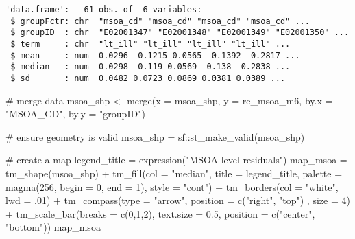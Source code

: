 \documentclass[
  letterpaper,
  krantz2]{style/krantz}
\newenvironment{Shaded}{\begin{snugshade}}{\end{snugshade}}
\newcommand{\AttributeTok}[1]{\textcolor[rgb]{0.40,0.45,0.13}{#1}}
\newcommand{\CommentTok}[1]{\textcolor[rgb]{0.37,0.37,0.37}{#1}}
\newcommand{\DecValTok}[1]{\textcolor[rgb]{0.68,0.00,0.00}{#1}}
\newcommand{\FloatTok}[1]{\textcolor[rgb]{0.68,0.00,0.00}{#1}}
\newcommand{\FunctionTok}[1]{\textcolor[rgb]{0.28,0.35,0.67}{#1}}
\newcommand{\NormalTok}[1]{\textcolor[rgb]{0.00,0.23,0.31}{#1}}
\newcommand{\OtherTok}[1]{\textcolor[rgb]{0.00,0.23,0.31}{#1}}
\newcommand{\SpecialCharTok}[1]{\textcolor[rgb]{0.37,0.37,0.37}{#1}}
\newcommand{\StringTok}[1]{\textcolor[rgb]{0.13,0.47,0.30}{#1}}
\begin{document}
\begin{verbatim}
'data.frame':   61 obs. of  6 variables:
 $ groupFctr: chr  "msoa_cd" "msoa_cd" "msoa_cd" "msoa_cd" ...
 $ groupID  : chr  "E02001347" "E02001348" "E02001349" "E02001350" ...
 $ term     : chr  "lt_ill" "lt_ill" "lt_ill" "lt_ill" ...
 $ mean     : num  0.0296 -0.1215 0.0565 -0.1392 -0.2817 ...
 $ median   : num  0.0298 -0.119 0.0569 -0.138 -0.2838 ...
 $ sd       : num  0.0482 0.0723 0.0869 0.0381 0.0389 ...
\end{verbatim}

\begin{Shaded}
\begin{Highlighting}[]
\CommentTok{\# merge data}
\NormalTok{msoa\_shp }\OtherTok{\textless{}{-}} \FunctionTok{merge}\NormalTok{(}\AttributeTok{x =}\NormalTok{ msoa\_shp, }\AttributeTok{y =}\NormalTok{ re\_msoa\_m6, }\AttributeTok{by.x =} \StringTok{"MSOA\_CD"}\NormalTok{, }\AttributeTok{by.y =} \StringTok{"groupID"}\NormalTok{)}
\end{Highlighting}
\end{Shaded}

\begin{Shaded}
\begin{Highlighting}[]
\CommentTok{\# ensure geometry is valid}
\NormalTok{msoa\_shp }\OtherTok{=}\NormalTok{ sf}\SpecialCharTok{::}\FunctionTok{st\_make\_valid}\NormalTok{(msoa\_shp)}

\CommentTok{\# create a map}
\NormalTok{legend\_title }\OtherTok{=} \FunctionTok{expression}\NormalTok{(}\StringTok{"MSOA{-}level residuals"}\NormalTok{)}
\NormalTok{map\_msoa }\OtherTok{=} \FunctionTok{tm\_shape}\NormalTok{(msoa\_shp) }\SpecialCharTok{+}
  \FunctionTok{tm\_fill}\NormalTok{(}\AttributeTok{col =} \StringTok{"median"}\NormalTok{, }\AttributeTok{title =}\NormalTok{ legend\_title, }\AttributeTok{palette =} \FunctionTok{magma}\NormalTok{(}\DecValTok{256}\NormalTok{, }\AttributeTok{begin =} \DecValTok{0}\NormalTok{, }\AttributeTok{end =} \DecValTok{1}\NormalTok{), }\AttributeTok{style =} \StringTok{"cont"}\NormalTok{) }\SpecialCharTok{+} 
  \FunctionTok{tm\_borders}\NormalTok{(}\AttributeTok{col =} \StringTok{"white"}\NormalTok{, }\AttributeTok{lwd =}\NormalTok{ .}\DecValTok{01}\NormalTok{)  }\SpecialCharTok{+} 
  \FunctionTok{tm\_compass}\NormalTok{(}\AttributeTok{type =} \StringTok{"arrow"}\NormalTok{, }\AttributeTok{position =} \FunctionTok{c}\NormalTok{(}\StringTok{"right"}\NormalTok{, }\StringTok{"top"}\NormalTok{) , }\AttributeTok{size =} \DecValTok{4}\NormalTok{) }\SpecialCharTok{+} 
  \FunctionTok{tm\_scale\_bar}\NormalTok{(}\AttributeTok{breaks =} \FunctionTok{c}\NormalTok{(}\DecValTok{0}\NormalTok{,}\DecValTok{1}\NormalTok{,}\DecValTok{2}\NormalTok{), }\AttributeTok{text.size =} \FloatTok{0.5}\NormalTok{, }\AttributeTok{position =}  \FunctionTok{c}\NormalTok{(}\StringTok{"center"}\NormalTok{, }\StringTok{"bottom"}\NormalTok{)) }
\NormalTok{map\_msoa}
\end{Highlighting}
\end{Shaded}
\end{document}
